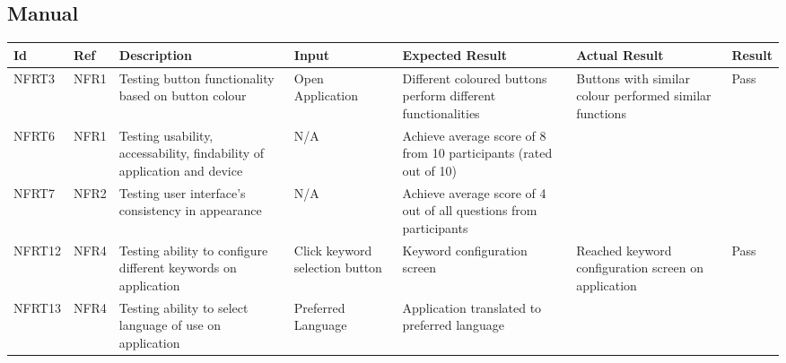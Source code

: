 \documentclass[12pt, titlepage]{article}
\begin{document}
\subsection{Manual}
\begin{longtable}{|p{1.4cm}|p{1cm}|p{3cm}|p{1.5cm}|p{2.5cm}|p{2cm}|p{1.2cm}|}
 
  \endfirsthead
  \endhead
  \hline
  \textbf{Id} & \textbf{Ref} & \textbf{Description}                                                         & \textbf{Input}                                    & \textbf{Expected Result}                                    & \textbf{Actual Result} & \textbf{Result}                                    \\ \hline
  NFRT3        & NFR1          & Testing button functionality based on button colour                     & Open Application                 & Different coloured buttons perform different functionalities    & Buttons with similar colour performed similar functions                        & {\color[HTML]{32CB00} Pass}                        \\ \hline
  NFRT6        & NFR1          & Testing usability, accessability, findability of application and device                     & N/A                              & Achieve average score of 8 from 10 participants (rated out of 10)                           &                       &  \cellcolor[HTML]{FFFFFF}{\color[HTML]{F8A102} TBD}                       \\ \hline
  NFRT7        & NFR2          & Testing user interface's consistency in appearance                     & N/A                              & Achieve average score of 4 out of all questions from participants                       &                        & \cellcolor[HTML]{FFFFFF}{\color[HTML]{F8A102} TBD} \\ \hline
  NFRT12        & NFR4         & Testing ability to configure different keywords on application                    & Click keyword selection button   & Keyword configuration screen                                                   & Reached keyword configuration screen on application                     & {\color[HTML]{32CB00} Pass}                                                    \\ \hline
  NFRT13        & NFR4         & Testing ability to select language of use on application                  & Preferred Language               & Application translated to preferred language                  &                        &           \cellcolor[HTML]{FFFFFF}{\color[HTML]{F8A102} TBD}                                         \\ \hline

\end{longtable}
\end{document}
